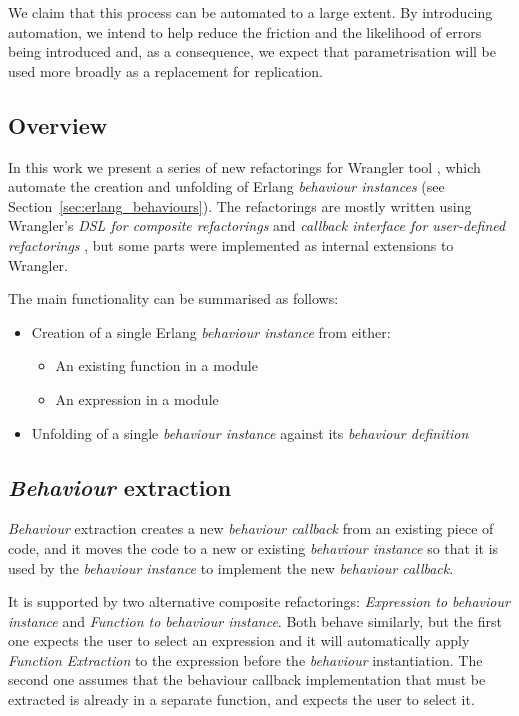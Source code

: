 We claim that this process can be automated to a large extent. By
introducing automation, we intend to help reduce the friction and
the likelihood of errors being introduced and, as a consequence, we
expect that parametrisation will be used more broadly as a replacement
for replication.

\subsection{Overview}

In this work we present a series of new refactorings for Wrangler tool
\cite{li2008refactoring}, which automate the creation and unfolding of Erlang
\emph{behaviour instances} (see Section~\ref{sec:erlang_behaviours}).
The refactorings are mostly written using Wrangler's \emph{DSL for composite
refactorings} \cite{li2012domain} and \emph{callback interface for
user-defined refactorings} \cite{li2011user}, but some parts were implemented
as internal extensions to Wrangler.

The main functionality can be summarised as follows:
\begin{itemize}
\item Creation of a single Erlang \emph{behaviour instance} from either:

\begin{itemize}
\item An existing function in a module
\item An expression in a module
\end{itemize}
\item Unfolding of a single \emph{behaviour instance} against its \emph{behaviour
definition}
\end{itemize}


\subsection{\emph{Behaviour} extraction\label{sec:behaviour-extraction}}

\emph{Behaviour} extraction creates a new \emph{behaviour callback} from an existing
piece of code, and it moves the code to a new or existing \emph{behaviour instance} so
that it is used by the \emph{behaviour instance} to implement the new
\emph{behaviour callback}.

It is supported by two alternative composite refactorings: \emph{Expression
to behaviour instance} and \emph{Function to behaviour instance}. Both
behave similarly, but the first one expects the user to select an expression
and it will automatically apply \emph{Function Extraction} to the expression
before the \emph{behaviour} instantiation. The second one assumes that the
behaviour callback implementation that must be extracted is already in a
separate function, and expects the user to select it.

